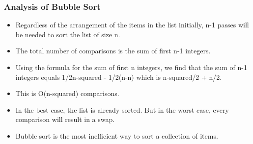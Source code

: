 \documentclass{beamer}
\begin{document}
\begin{frame}
\frametitle{Analysis of Bubble Sort}
\begin{itemize}
\item Regardless of the arrangement of the items  in the list initially, n-1 passes will be needed to sort the list of size n.
\item The total number of comparisons is the sum of first n-1 integers. 
\item Using the formula for the sum of first n integers, we find that the sum of n-1 integers equals 1/2n-squared - 1/2(n-n) which is n-squared/2 + n/2. 
\item This is O(n-squared) comparisons.
\item In the best case, the list is already sorted. But in the worst case, every comparison will result in a swap. 
\item Bubble sort is the most inefficient way to sort a collection of items.
\end{itemize}
\end{frame}
\end{document}
